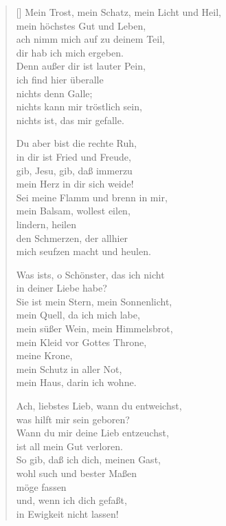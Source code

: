 \begin{multicols}{2}
\begin{verse}[\versewidth]
 Mein Trost, mein Schatz, mein Licht und Heil,\\
mein höchstes Gut und Leben,\\
ach nimm mich auf zu deinem Teil,\\
dir hab ich mich ergeben.\\
Denn außer dir ist lauter Pein,\\
ich find hier überalle\\
nichts denn Galle;\\
nichts kann mir tröstlich sein,\\
nichts ist, das mir gefalle.

 Du aber bist die rechte Ruh,\\
in dir ist Fried und Freude,\\
gib, Jesu, gib, daß immerzu\\
mein Herz in dir sich weide!\\
Sei meine Flamm und brenn in mir,\\
mein Balsam, wollest eilen,\\
lindern, heilen\\
den Schmerzen, der allhier\\
mich seufzen macht und heulen.

 Was ists, o Schönster, das ich nicht\\
in deiner Liebe habe?\\
Sie ist mein Stern, mein Sonnenlicht,\\
mein Quell, da ich mich labe,\\
mein süßer Wein, mein Himmelsbrot,\\
mein Kleid vor Gottes Throne,\\
meine Krone,\\
mein Schutz in aller Not,\\
mein Haus, darin ich wohne.

\vfill\null
\columnbreak

 Ach, liebstes Lieb, wann du entweichst,\\
was hilft mir sein geboren?\\
Wann du mir deine Lieb entzeuchst,\\
ist all mein Gut verloren.\\
So gib, daß ich dich, meinen Gast,\\
wohl such und bester Maßen\\
möge fassen\\
und, wenn ich dich gefaßt,\\
in Ewigkeit nicht lassen!


\end{verse}
\end{multicols}

